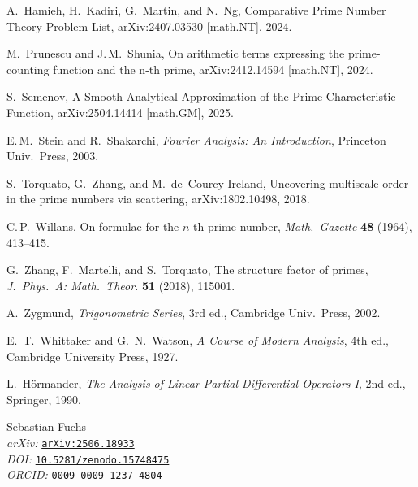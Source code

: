 \documentclass[11pt,a4paper]{amsart}
\theoremstyle{plain}
\theoremstyle{definition}
\theoremstyle{remark}
\begin{document}
\begin{thebibliography}{99}
A.~Hamieh, H.~Kadiri, G.~Martin, and N.~Ng,
Comparative Prime Number Theory Problem List, arXiv:2407.03530 [math.NT], 2024.

M.~Prunescu and J.\,M.~Shunia, On arithmetic terms expressing the prime-counting function and the n-th prime, arXiv:2412.14594 [math.NT], 2024.

S.~Semenov, A Smooth Analytical Approximation of the Prime Characteristic Function, arXiv:2504.14414 [math.GM], 2025.

E.\,M.~Stein and R.~Shakarchi, \emph{Fourier Analysis: An Introduction}, Princeton Univ.\ Press, 2003.

S.~Torquato, G.~Zhang, and M.~de~Courcy-Ireland,
Uncovering multiscale order in the prime numbers via scattering, arXiv:1802.10498, 2018.

C.\,P.~Willans, On formulae for the $n$-th prime number, \emph{Math.\ Gazette} \textbf{48} (1964), 413–415.

G.~Zhang, F.~Martelli, and S.~Torquato,
The structure factor of primes,
\emph{J.\ Phys.\ A: Math.\ Theor.} \textbf{51} (2018), 115001.

A.~Zygmund, \emph{Trigonometric Series}, 3rd ed., Cambridge Univ.\ Press, 2002.

E.~T.~Whittaker and G.~N.~Watson, \emph{A Course of Modern Analysis}, 4th ed., Cambridge University Press, 1927.

L.~H\"ormander, \emph{The Analysis of Linear Partial Differential Operators I}, 2nd ed., Springer, 1990.

\end{thebibliography}



\vfill
\par\noindent
\small
Sebastian Fuchs \\[1ex]
\textit{arXiv:} \texttt{\href{https://arxiv.org/abs/2506.18933}{arXiv:2506.18933}} \\
\textit{DOI:} \texttt{\href{https://doi.org/10.5281/zenodo.15748475}{10.5281/zenodo.15748475}} \\ 
\textit{ORCID:} \texttt{\href{https://orcid.org/0009-0009-1237-4804}{0009-0009-1237-4804}} \\
\end{document}
